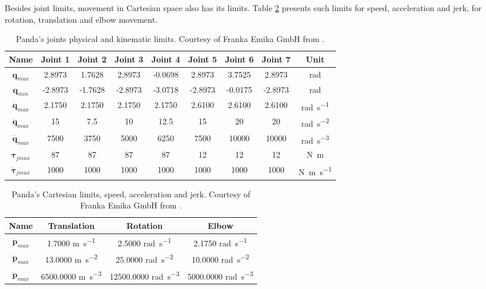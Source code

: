 Besides joint limits, movement in Cartesian space also has its limits. Table \ref{tab:panda_cartesian_limits} presents such limits for speed, acceleration and jerk, for rotation, translation and elbow movement.

\begin{table}[htbp]
    \caption{Panda's joints physical and kinematic limits. Courtesy of Franka Emika GmbH from \cite{FrankaEmikaGmbH_fci_documentation}.}
    \centering
    \begin{tabular}{c|c|c|c|c|c|c|c|c}
        \toprule
        \textbf{Name} & \textbf{Joint 1} & \textbf{Joint 2} & \textbf{Joint 3} & \textbf{Joint 4} & \textbf{Joint 5} & \textbf{Joint 6} & \textbf{Joint 7} & \textbf{Unit} \\
        \midrule
        $\boldsymbol{q}_{max}$ & 2.8973 & 1.7628 & 2.8973  & -0.0698 & 2.8973 & 3.7525 & 2.8973 & \si{\radian}\\
        $\boldsymbol{q}_{min}$ & -2.8973 & -1.7628 & -2.8973 & -3.0718 & -2.8973 & -0.0175 & -2.8973 & \si{\radian} \\
        $\dot{\boldsymbol{q}}_{max}$ & 2.1750 & 2.1750 & 2.1750 & 2.1750 & 2.6100 & 2.6100 & 2.6100 & \si{\radian\per\second} \\
        $\ddot{\boldsymbol{q}}_{max}$ & 15 & 7.5 & 10 & 12.5 & 15 & 20 & 20 & \si{\radian\per\second\squared} \\
        $\dddot{\boldsymbol{q}}_{max}$ & 7500 &	3750 &	5000 & 6250 & 7500 & 10000 & 10000 & \si{\radian\per\second\cubed} \\
        $\boldsymbol{\tau}_{jmax}$ & 87 & 87 & 87 & 87 & 12  & 12 & 12 & \si{\newton\meter} \\
        $\dot{\boldsymbol{\tau}}_{jmax}$ & 1000 & 1000 & 1000 & 1000 & 1000 & 1000 & 1000 & \si{\newton\meter\per\second} \\
        \bottomrule
    \end{tabular}
    \label{tab:panda_joint_limits}
\end{table}

\begin{table}[htbp]
    \caption{Panda's Cartesian limits, speed, acceleration and jerk. Courtesy of Franka Emika GmbH from \cite{FrankaEmikaGmbH_fci_documentation}.}
    \centering
    \begin{tabular}{c|c|c|c}
        \toprule
        \textbf{Name} & \textbf{Translation} & \textbf{Rotation} & \textbf{Elbow} \\
        \midrule
        $\dot{\boldsymbol{p}}_{max}$ & 1.7000 \si{\meter\per\second} & 2.5000 \si{\radian\per\second} & 2.1750 \si{\radian\per\second} \\
        $\ddot{\boldsymbol{p}}_{max}$ & 13.0000 \si{\meter\per\second\squared} & 25.0000 \si{\radian\per\second\squared} & 10.0000 \si{\radian\per\second\squared} \\
        $\dddot{\boldsymbol{p}}_{max}$ & 6500.0000 \si{\meter\per\second\cubed} & 12500.0000 \si{\radian\per\second\cubed} & 5000.0000 \si{\radian\per\second\cubed} \\
        \bottomrule
    \end{tabular}
    \label{tab:panda_cartesian_limits}
\end{table}

